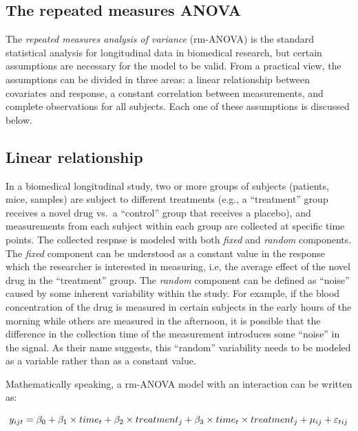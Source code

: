 \documentclass[
]{article}
\begin{document}
\hypertarget{the-repeated-measures-anova}{%
\subsection{The repeated measures ANOVA}\label{the-repeated-measures-anova}}

The \emph{repeated measures analysis of variance} (rm-ANOVA) is the standard statistical analysis for longitudinal data in biomedical research, but certain assumptions are necessary for the model to be valid. From a practical view, the assumptions can be divided in three areas: a linear relationship between covariates and response, a constant correlation between measurements, and complete observations for all subjects. Each one of these assumptions is discussed below.

\hypertarget{linear-relationship}{%
\subsection{Linear relationship}\label{linear-relationship}}

In a biomedical longitudinal study, two or more groups of subjects (patients, mice, samples) are subject to different treatments (e.g., a ``treatment'' group receives a novel drug vs.~a ``control'' group that receives a placebo), and measurements from each subject within each group are collected at specific time points. The collected respnse is modeled with both \emph{fixed} and \emph{random} components. The \emph{fixed} component can be understood as a constant value in the response which the researcher is interested in measuring, i.e, the average effect of the novel drug in the ``treatment'' group. The \emph{random} component can be defined as ``noise'' caused by some inherent variability within the study. For example, if the blood concentration of the drug is measured in certain subjects in the early hours of the morning while others are measured in the afternoon, it is possible that the difference in the collection time of the measurement introduces some ``noise'' in the signal. As their name suggests, this ``random'' variability needs to be modeled as a variable rather than as a constant value.

Mathematically speaking, a rm-ANOVA model with an interaction can be written as:

\begin{equation}
y_{ijt} = \beta_0+ \beta_1 \times time_{t} + \beta_2 \times treatment_{j} + \beta_3 \times time_{t}\times treatment_{j}+\mu_{ij} +\varepsilon_{tij}\\ 
\label{eq:linear-model}
\end{equation}
\end{document}
